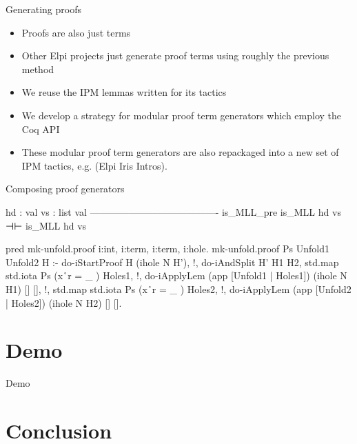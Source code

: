 \documentclass[aspectratio=169]{beamer}
\begin{document}
\begin{frame}[fragile]{Generating proofs}
    \begin{itemize}[<+->]
        \item Proofs are also just terms %
        \item Other Elpi projects just generate proof terms using roughly the previous method
        \item We reuse the IPM lemmas written for its tactics
        \item We develop a strategy for modular proof term generators which employ the Coq API
        \item These modular proof term generators are also repackaged into a new set of IPM tactics, e.g.  (Elpi Iris Intros).
    \end{itemize}
\end{frame}

\begin{frame}[fragile]{Composing proof generators}
    \begin{coqcode}
        hd : val
        vs : list val
        ----------------------------------------
        is_MLL_pre is_MLL hd vs ⊣⊢ is_MLL hd vs
    \end{coqcode}
    \begin{elpicode}
        pred mk-unfold.proof i:int, i:term, i:term, i:hole.
        mk-unfold.proof Ps Unfold1 Unfold2 H :-
          do-iStartProof H (ihole N H'), !,
          do-iAndSplit H' H1 H2,
          std.map {std.iota Ps} (x\r\ r = {{ _ }}) Holes1, !,
          do-iApplyLem (app [Unfold1 | Holes1]) (ihole N H1) [] [], !,
          std.map {std.iota Ps} (x\r\ r = {{ _ }}) Holes2, !,
          do-iApplyLem (app [Unfold2 | Holes2]) (ihole N H2) [] [].
    \end{elpicode}
\end{frame}

\section{Demo}
\begin{frame}
    \begin{center}
        \LARGE {} Demo
    \end{center}
\end{frame}

\section{Conclusion}
\end{document}
